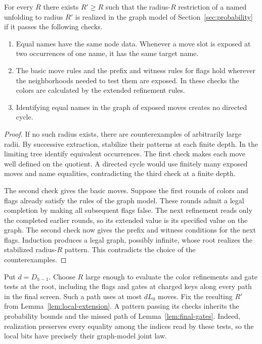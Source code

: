 \begin{lemma}\label{lem:local-extension}
For every \(R\) there exists \(R'\ge R\) such that the radius-\(R\)
restriction of a named unfolding to radius \(R'\) is realized in the graph
model of Section~\ref{sec:probability} if it passes the following checks.
\begin{enumerate}
\item Equal names have the same node data. Whenever a move slot is
exposed at two occurrences of one name, it has the same target name.
\item The basic move rules and the prefix and witness rules for flags hold
wherever the neighborhoods needed to test them are exposed. In these
checks the colors are calculated by the extended refinement rules.
\item Identifying equal names in the graph of exposed moves creates no
directed cycle.
\end{enumerate}
\end{lemma}
\begin{proof}
If no such radius exists, there are counterexamples of arbitrarily large
radii. By successive extraction, stabilize their patterns at each finite
depth. In the limiting tree identify equivalent occurrences. The first
check makes each move well defined on the quotient. A directed cycle
would use finitely many exposed moves and name equalities, contradicting
the third check at a finite depth.

The second check gives the basic moves. Suppose the first rounds of
colors and flags already satisfy the rules of the graph model. These
rounds admit a legal completion by making all subsequent flags false.
The next refinement reads only the completed earlier rounds, so its
extended value is its specified value on the graph. The second check now
gives the prefix and witness conditions for the next flags. Induction
produces a legal graph, possibly infinite, whose root realizes the
stabilized radius-\(R\) pattern. This contradicts the choice of the
counterexamples.
\end{proof}

Put \(d=D_{h-1}\). Choose \(R\) large enough to evaluate the color
refinements and gate tests at the root, including the flags and gates at
charged keys along every path in the final screen. Such a path uses at
most \(dL_0\) moves. Fix the resulting \(R'\) from
Lemma~\ref{lem:local-extension}. A pattern passing its checks inherits
the probability bounds and the missed path of Lemma~\ref{lem:final-gates}.
Indeed, realization preserves every equality among the indices read by
these tests, so the local bits have precisely their graph-model joint law.

